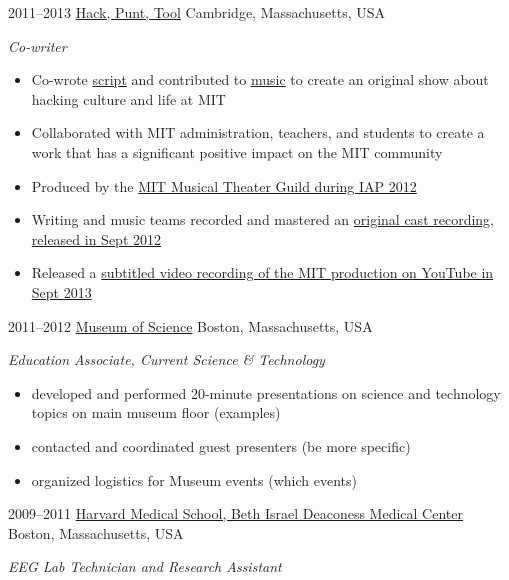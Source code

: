 \documentclass[10pt, a4]{friggeri-cv}
\begin{document}
\begin{entrylist}
  \entry
	{2011--2013}
	{\href{http://hackpunttool.com/}{Hack, Punt, Tool}}
	{Cambridge, Massachusetts, USA}
	{\emph{Co-writer}
	\begin{itemize}
		\item Co-wrote \href{http://hackpunttool.files.wordpress.com/2012/03/hptfinalscript.pdf}{script} and contributed to \href{http://hackpunttool.files.wordpress.com/2012/03/hpt-pc-score-2-16-12.pdf}{music} to create an original show about hacking culture and life at MIT
		\item Collaborated with MIT administration, teachers, and students to create a work that has a significant positive impact on the MIT community
		\item Produced by the \href{http://web.mit.edu/mtg/www/2012/IAP/ProdStaff.html}{MIT Musical Theater Guild during IAP 2012}
		\item Writing and music teams recorded and mastered an \href{http://hackpunttool.bandcamp.com/}{original cast recording, released in Sept 2012}
		\item Released a \href{https://www.youtube.com/playlist?list=PLEUCiGVkvGkd9ZECCR2aLecWmMHvccJtI}{subtitled video recording of the MIT production on YouTube in Sept 2013}
	\end{itemize}
	}
  \entry
	{2011--2012}
	{\href{http://www.mos.org/}{Museum of Science}}
	{Boston, Massachusetts, USA}
	{\emph{Education Associate, Current Science \& Technology}
	\begin{itemize}
		\item developed and performed 20-minute presentations on science and technology topics on main museum floor (examples)
		\item contacted and coordinated guest presenters (be more specific)
		\item organized logistics for Museum events (which events)
	\end{itemize}
	}
  \entry
	{2009--2011}
	{\href{http://www.bidmc.org/}{Harvard Medical School, Beth Israel Deaconess Medical Center}}
	{Boston, Massachusetts, USA}
	{\emph{EEG Lab Technician and Research Assistant}
	\begin{itemize}

\end{itemize}}
\end{entrylist}
\end{document}
